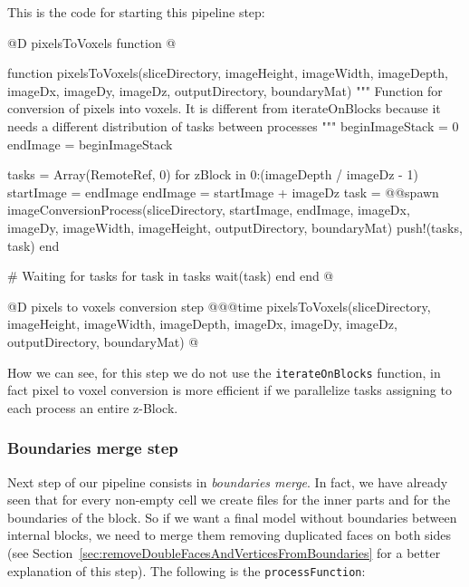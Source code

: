 \documentclass[11pt,oneside]{article}	%
\begin{document}
This is the code for starting this pipeline step:

@D pixelsToVoxels function
@{function pixelsToVoxels(sliceDirectory,
                        imageHeight, imageWidth, imageDepth,
                        imageDx, imageDy, imageDz,
                        outputDirectory,
                        boundaryMat)
  """
  Function for conversion of pixels into voxels. It is different
  from iterateOnBlocks because it needs a different distribution
  of tasks between processes
  """
  beginImageStack = 0
  endImage = beginImageStack

  tasks = Array(RemoteRef, 0)
  for zBlock in 0:(imageDepth / imageDz - 1)
    startImage = endImage
    endImage = startImage + imageDz
    task = @@spawn imageConversionProcess(sliceDirectory,
                                         startImage, endImage,
                                         imageDx, imageDy,
                                         imageWidth, imageHeight,
                                         outputDirectory,
                                         boundaryMat)
    push!(tasks, task)
  end

  # Waiting for tasks
  for task in tasks
    wait(task)
  end
end @}

@D pixels to voxels conversion step
@{@@time pixelsToVoxels(sliceDirectory,
                    imageHeight, imageWidth, imageDepth,
                    imageDx, imageDy, imageDz,
                    outputDirectory,
                    boundaryMat) @}
                    
How we can see, for this step we do not use the \texttt{iterateOnBlocks} function, in fact pixel to voxel conversion is more efficient if we parallelize tasks assigning to each process an entire z-Block.

\subsubsection{Boundaries merge step}\label{sec:boundariesStep}
Next step of our pipeline consists in \textit{boundaries merge}. In fact, we have already seen that for every non-empty cell we create files for the inner parts and for the boundaries of the block. So if we want a final model without boundaries between internal blocks, we need to merge them removing duplicated faces on both sides (see Section~\ref{sec:removeDoubleFacesAndVerticesFromBoundaries} for a better explanation of this step). The following is the \texttt{processFunction}:
\end{document}
